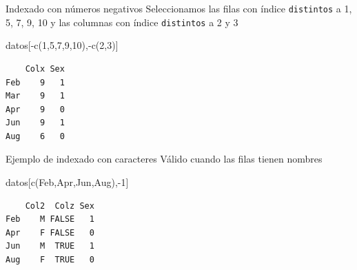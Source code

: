 \documentclass[
  ignorenonframetext,
  aspectratio=169,
  spanish,
]{beamer}
\newenvironment{Shaded}{\begin{snugshade}}{\end{snugshade}}
\newcommand{\DecValTok}[1]{\textcolor[rgb]{0.68,0.00,0.00}{#1}}
\newcommand{\FunctionTok}[1]{\textcolor[rgb]{0.28,0.35,0.67}{#1}}
\newcommand{\NormalTok}[1]{\textcolor[rgb]{0.00,0.23,0.31}{#1}}
\newcommand{\SpecialCharTok}[1]{\textcolor[rgb]{0.37,0.37,0.37}{#1}}
\newcommand{\StringTok}[1]{\textcolor[rgb]{0.13,0.47,0.30}{#1}}
\begin{document}
\begin{frame}[fragile]{Indexado con números negativos}
\label{indexado-con-nuxfameros-negativos}
Seleccionamos las filas con índice \texttt{distintos} a 1, 5, 7, 9, 10 y
las columnas con índice \texttt{distintos} a 2 y 3

\begin{Shaded}
\begin{Highlighting}[]
\NormalTok{datos[}\SpecialCharTok{{-}}\FunctionTok{c}\NormalTok{(}\DecValTok{1}\NormalTok{,}\DecValTok{5}\NormalTok{,}\DecValTok{7}\NormalTok{,}\DecValTok{9}\NormalTok{,}\DecValTok{10}\NormalTok{),}\SpecialCharTok{{-}}\FunctionTok{c}\NormalTok{(}\DecValTok{2}\NormalTok{,}\DecValTok{3}\NormalTok{)]}
\end{Highlighting}
\end{Shaded}

\begin{verbatim}
    Colx Sex
Feb    9   1
Mar    9   1
Apr    9   0
Jun    9   1
Aug    6   0
\end{verbatim}
\end{frame}

\begin{frame}[fragile]{Ejemplo de indexado con caracteres}
\label{ejemplo-de-indexado-con-caracteres}
Válido cuando las filas tienen nombres

\begin{Shaded}
\begin{Highlighting}[]
\NormalTok{datos[}\FunctionTok{c}\NormalTok{(}\StringTok{\textquotesingle{}Feb\textquotesingle{}}\NormalTok{,}\StringTok{\textquotesingle{}Apr\textquotesingle{}}\NormalTok{,}\StringTok{\textquotesingle{}Jun\textquotesingle{}}\NormalTok{,}\StringTok{\textquotesingle{}Aug\textquotesingle{}}\NormalTok{),}\SpecialCharTok{{-}}\DecValTok{1}\NormalTok{]  }
\end{Highlighting}
\end{Shaded}

\begin{verbatim}
    Col2  Colz Sex
Feb    M FALSE   1
Apr    F FALSE   0
Jun    M  TRUE   1
Aug    F  TRUE   0
\end{verbatim}
\end{frame}
\end{document}
